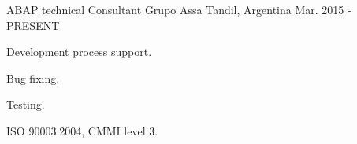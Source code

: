 


\begin{cventries}


\cventry
{ABAP technical Consultant} %
{Grupo Assa} %
{Tandil, Argentina} %
{Mar. 2015 - PRESENT} %
{ %
\begin{cvitems}
\item {Development process support.}
\item {Bug fixing.}
\item {Testing.}
\item {ISO 90003:2004, CMMI level 3.}
\end{cvitems}
}



\end{cventries}
